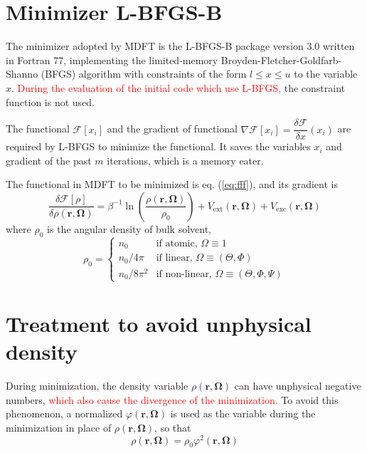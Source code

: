\section{Minimizer L-BFGS-B}

The minimizer adopted by MDFT is the L-BFGS-B \citep{Zhu_1994_bfgs,Zhu_bfgs_1997_algorithm}
package version 3.0 written in Fortran 77, implementing the limited-memory
Broyden-Fletcher-Goldfarb-Shanno (BFGS) algorithm with constraints
of the form $l\leq x\leq u$ to the variable $x$. \textcolor{red}{During
the evaluation of the initial code which use L-BFGS,} the constraint
function is not used.

The functional $\mathcal{F}[x_{i}]$ and the gradient of functional
$\nabla\mathcal{F}[x_{i}]=\dfrac{\delta\mathcal{F}}{\delta x}(x_{i})$
are required by L-BFGS to minimize the functional. It saves the variables
$x_{i}$ and gradient of the past $m$ iterations, which is a memory
eater.

The functional in MDFT to be minimized is eq. (\ref{eq:fff}), and
its gradient is
\begin{equation}
\frac{\delta\mathcal{F}[\rho]}{\delta\rho(\mathbf{r},\mathbf{\Omega})}=\beta^{-1}\ln\left(\dfrac{\rho(\mathbf{r},\mathbf{\Omega})}{\rho_{0}}\right)+V_{\mathrm{ext}}(\mathbf{r},\mathbf{\Omega})+V_{\mathrm{exc}}(\mathbf{r},\mathbf{\Omega})
\end{equation}
where $\rho_{0}$ is the angular density of bulk solvent, 
\begin{equation}
\rho_{0}=\left\{ \begin{array}{ll}
n_{0} & \mbox{if atomic, }\Omega\equiv1\\
n_{0}/4\pi & \mbox{if linear, }\Omega\equiv(\Theta,\Phi)\\
n_{0}/8\pi^{2} & \mbox{if non-linear, }\Omega\equiv(\Theta,\Phi,\Psi)
\end{array}\right.\label{eq:rho}
\end{equation}


\section{Treatment to avoid unphysical density}

During minimization, the density variable $\rho(\mathbf{r},\mathbf{\Omega})$
can have unphysical negative numbers, \textcolor{red}{which also cause
the divergence of the minimization.} To avoid this phenomenon, a normalized
$\varphi(\mathbf{r},\mathbf{\Omega})$ is used as the variable during
the minimization in place of $\rho(\mathbf{r},\mathbf{\Omega})$,
so that
\begin{equation}
\rho(\mathbf{r},\mathbf{\Omega})=\rho_{0}\varphi^{2}(\mathbf{r},\mathbf{\Omega})\label{eq:cg_vect}
\end{equation}

